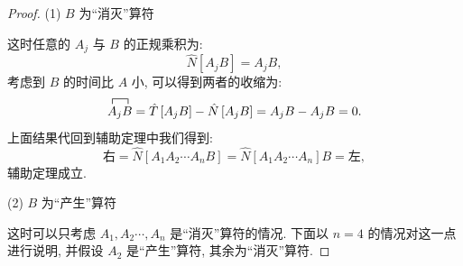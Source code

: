 \begin{proof}
(1) $B$ 为“消灭”算符

这时任意的 $A_{j}$ 与 $B$ 的正规乘积为:
\begin{equation}
\hat{N}\left[A_{j} B\right]=A_{j} B,
\end{equation}
考虑到 $B$ 的时间比 $A$ 小, 可以得到两者的收缩为:
\begin{equation}
\contraction{}{A}{_{j}}{B}{A}_{j} B=\hat{T}\left[A_{j} B\right]-\hat{N}\left[A_{j} B\right]=A_{j} B-A_{j} B=0.
\end{equation}
上面结果代回到辅助定理中我们得到:
\begin{equation}
\text {右}=\hat{N}\left[A_{1} A_{2} \cdots A_{n} B\right]=\hat{N}\left[A_{1} A_{2} \cdots A_{n}\right] B=\text {左},
\end{equation}
辅助定理成立.

(2) $B$ 为“产生”算符

这时可以只考虑 $A_{1}, A_{2} \cdots, A_{n}$ 是“消灭”算符的情况. 下面以 $n=4$ 的情况对这一点进行说明, 并假设 $A_{2}$ 是“产生”算符, 其余为“消灭”算符.


\end{proof}
